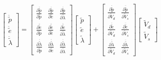 \[\left[ {\begin{array}{*{20}{c}}
{\ddot \tilde p}\\
{\ddot \tilde e}\\
{\ddot \tilde \lambda }
\end{array}} \right] = \left[ {\begin{array}{*{20}{c}}
{\frac{{\partial \ddot \tilde p}}{{\partial \tilde p}}}&{\frac{{\partial \ddot \tilde p}}{{\partial \tilde{e}}}}&{\frac{{\partial \ddot \tilde p}}{{\partial \tilde \lambda }}}\\
{\frac{{\partial \ddot \tilde e}}{{\partial \tilde p}}}&{\frac{{\partial \ddot \tilde e}}{{\partial \tilde e}}}&{\frac{{\partial \ddot \tilde e}}{{\partial \tilde \lambda }}}\\
{\frac{{\partial \ddot \tilde \lambda }}{{\partial \tilde p}}}&{\frac{{\partial \ddot \tilde \lambda }}{{\partial \tilde e}}}&{\frac{{\partial \ddot \tilde \lambda }}{{\partial \tilde \lambda }}}
\end{array}} \right]\left[ {\begin{array}{*{20}{c}}
{\tilde p}\\
{\tilde e}\\
{\tilde \lambda }
\end{array}} \right] + \left[ {\begin{array}{*{20}{c}}
{\frac{{\partial \ddot \tilde p}}{{\partial {{\tilde V}_d}}}}&{\frac{{\partial \ddot \tilde p}}{{\partial {{\tilde V}_s}}}}\\
{\frac{{\partial \ddot \tilde e}}{{\partial {{\tilde V}_d}}}}&{\frac{{\partial \ddot \tilde e}}{{\partial {{\tilde V}_s}}}}\\
{\frac{{\partial \ddot \tilde \lambda }}{{\partial {{\tilde V}_d}}}}&{\frac{{\partial \ddot \tilde \lambda }}{{\partial {{\tilde V}_s}}}}
\end{array}} \right]\left[ {\begin{array}{*{20}{c}}
{{{\tilde V}_d}}\\
{{{\tilde V}_s}}
\end{array}} \right]\]

%


